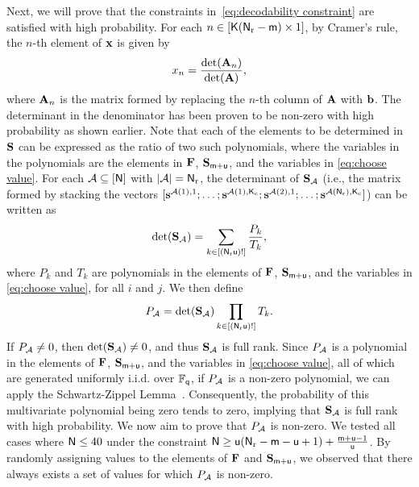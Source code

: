\documentclass[conference,letterpaper]{IEEEtran}
\begin{document}
Next, we will prove that the constraints in~\eqref{eq:decodability constraint} are satisfied with high probability.
For each \( n \in \left[{\sf K}({\sf N}_{\rm r} - {\sf m}) \times 1\right] \), by Cramer's rule, the \( n \)-th element of \( {\bf x} \) is given by
\begin{equation}
x_n = \frac{\text{det}({{\bf A}_n})}{\text{det}({\bf A})},\label{cramer}
\end{equation}
where \( {{\bf A}_n} \) is the matrix formed by replacing the \( n \)-th column of \( {\bf A} \) with \( {\bf b} \). The determinant in the denominator has been proven to be non-zero with high probability as shown earlier.
Note that each of the elements to be determined in \( {\bf S} \) can be expressed as the ratio of two such polynomials, where the variables in the polynomials are the elements in \( {\bf F} \), \( {\bf S}_{{\sf m}+{\sf u}} \), and the variables in \eqref{eq:choose value}.
For each \( {\cal A} \subseteq [{\sf N}] \) with \( |{\cal A}| = {\sf N}_{\rm r} \), the determinant of \( {\bf S}_{{\cal A}} \) (i.e., the matrix formed by stacking the vectors \( [{\bf s}^{{\cal A}(1),1}; \ldots; {\bf s}^{{\cal A}(1),{\sf K}_{\rm c}}; {\bf s}^{{\cal A}(2),1}; \ldots; {\bf s}^{{\cal A}({\sf N}_{\rm r}),{\sf K}_{\rm c}}] \)) can be written as
\begin{equation}
\text{det}({\bf S}_{{\cal A}}) = \sum_{k \in [({\sf N}_{\rm r}{\sf u})!]} \frac{P_k}{T_k},\label{eq:polynomial}
\end{equation}
where \( P_k \) and \( T_k \) are polynomials in the elements of \( {\bf F} \), \( {\bf S}_{{\sf m}+{\sf u}} \), and the variables in \eqref{eq:choose value}, for all \( i \) and \( j \).
We then define 
\begin{equation}
 P_{{\cal A}} = \text{det}({\bf S}_{{\cal A}}) \prod_{k \in [({\sf N}_{\rm r}{\sf u})!]} T_k . \label{eq:full rank}
\end{equation}
If \( P_{{\cal A}} \neq 0 \), then \( \text{det}({\bf S}_{{\cal A}}) \neq 0 \), and thus \( {\bf S}_{{\cal A}} \) is full rank.
Since \( P_{{\cal A}} \) is a polynomial in the elements of \( {\bf F} \), \( {\bf S}_{{\sf m}+{\sf u}} \), and the variables in \eqref{eq:choose value}, all of which are generated uniformly i.i.d. over \( \mathbb{F}_{{\sf q}} \), if \( P_{{\cal A}} \) is a non-zero polynomial, we can apply the Schwartz-Zippel Lemma~\cite{lemma1,lemma2,lemma3}. Consequently, the probability of this multivariate polynomial being zero tends to zero, implying that \( {\bf S}_{{\cal A}} \) is full rank with high probability.
We now aim to prove that \( P_{{\cal A}} \) is non-zero. We tested all cases where \( {\sf N} \leq 40 \) under the constraint \( {\sf N} \geq {\sf u}({\sf N}_{\rm r} - {\sf m} - {\sf u} + 1) + \frac{{\sf m}+{\sf u}-1}{{\sf u}}  \). By randomly assigning values to the elements of \( {\bf F} \) and \( {\bf S}_{{\sf m}+{\sf u}} \), we observed that there always exists a set of values for which \( P_{{\cal A}} \) is non-zero.
\end{document}

